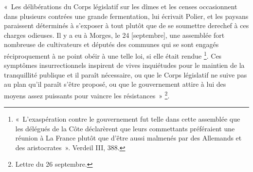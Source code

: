 \documentclass[french,twoside]{book} %
\newenvironment{quoteblock}%
  {\begin{quoting}}
  {\end{quoting}}
\newenvironment{quotebar}{%
    \def\FrameCommand{{\color{rubric!10!}\vrule width 0.5em} \hspace{0.9em}}%
    \def\OuterFrameSep{\itemsep} %
    \MakeFramed {\advance\hsize-\width \FrameRestore}
  }%
  {%
    \endMakeFramed
  }
\renewenvironment{quoteblock}%
  {%
    \savenotes
    \setstretch{0.9}
    \normalfont
    \begin{quotebar}
  }
  {%
    \end{quotebar}
    \spewnotes
  }
\begin{document}
\begin{quoteblock}
 \noindent « Les délibérations du Corps législatif sur les dîmes et les censes occasionnent dans plusieurs contrées une grande fermentation, lui écrivait Polier, et les paysans paraissent déterminés à s’exposer à tout plutôt que de se soumettre derechef à ces charges odieuses. Il y a eu à Morges, le 24 [septembre], une assemblée fort nombreuse de cultivateurs et députés des communes qui se sont engagés réciproquement à ne point obéir à une telle loi, si elle était rendue \footnote{« L’exaspération contre le gouvernement fut telle dans cette assemblée que les délégués de la Côte déclarèrent que leurs commettants préféraient une réunion à La France plutôt que d’être aussi malmenés par des Allemands et des aristocrates ». Verdeil III, 388.}. Ces symptômes insurrectionnels inspirent de vives inquiétudes pour le maintien de la tranquillité publique et il paraît nécessaire, ou que le Corps législatif ne suive pas au plan qu’il paraît s’être proposé, ou que le gouvernement attire à lui des moyens assez puissants pour vaincre les résistances » \footnote{Lettre du 26 septembre.}.
 \end{quoteblock}
\end{document}
